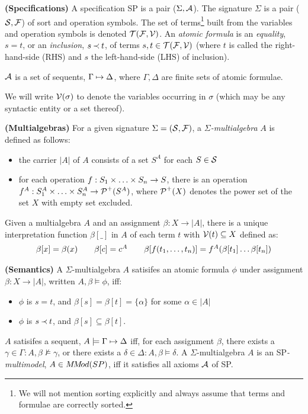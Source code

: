 \begin{DEFINITION} {\bf (Specifications)} \label{de:terms-vars-forms}
A specification SP is a pair ($\Sigma,\Ax$). The signature $\Sigma$ is a pair
($\Sorts,\Funcs$) of sort and operation symbols. 
The set of terms\footnote{We will not mention sorting explicitly
and always assume that terms and formulae are correctly sorted.}
 built from the variables and
operation symbols is denoted $\Terms{\Funcs,\C V}$. An {\em atomic formula} 
is an {\em equality}, $s=t$, or an {\em inclusion}, $s\Incl t$, of terms
$s,t\in\Terms{\Funcs,\Vars}$ (where $t$ is called the 
right-hand-side (RHS) and $s$ the left-hand-side (LHS) of inclusion).

 $\Ax$ is a set of sequents, $\Gamma\Seq\Delta$, where $\Gamma, \Delta$ are
finite sets of atomic formulae.
\end{DEFINITION}
\noindent
We will write $\C V(\sigma)$ to denote the variables occurring in $\sigma$ 
(which may be any syntactic entity or a set thereof).
%
\begin{DEFINITION} {\bf (Multialgebras)} \label{de:multialgebras}
For a given signature $\Sigma=(\Sorts,\Funcs)$, a {\em $\Sigma$-multialgebra} $A$
is defined as follows:
\begin{itemize}\MyLPar
\item  the carrier $|A|$ of $A$ consists of a set $S^A$ for each $S\in\Sorts$
\item for each operation $f: \List Sn\times \rightarrow S$, there is an operation
$f^A: \List {S^A}n\times \rightarrow \C P^+(S^A)$, where $\C P^+(X)$ denotes the 
power set of the set $X$ with empty set excluded.
\end{itemize}
\end{DEFINITION}
\noindent
Given a multialgebra $A$ and an assignment $\beta:X\rightarrow |A|$, there is a
unique interpretation function $\beta [\_]$ in $A$ of each term $t$ 
with $\C V(t)\subseteq X$ defined as:
\[ \begin{array}{ccccc} 
\beta [x] = \beta (x) & & \beta [c] = c^A
& & \beta [f(\List tn,)] = f^A(\beta[t_1]\ldots \beta[t_n]) 
\end{array} \]
%
\begin{DEFINITION} {\bf (Semantics)} \label{de:semantics}
A $\Sigma$-multialgebra $A$ satisifes an atomic formula $\phi$ under assignment
 $\beta:X\rightarrow |A|$, written $A,\beta\models \phi$, iff:
\begin{itemize}\MyLPar
\item $\phi$ is $s=t$, and $\beta[s]=\beta[t]=\{\alpha\}$ for some $\alpha\in |A|$
\item $\phi$ is $s\Incl t$, and $\beta[s]\subseteq\beta[t]$.
\end{itemize}
 $A$ satisifes a sequent, $A\models\Gamma\Seq\Delta$ iff,
for each assignment $\beta$, there exists a $\gamma\in\Gamma : A,\beta\not\models
\gamma$, or there exists a $\delta\in\Delta: A,\beta\models \delta$. 
A $\Sigma$-multialgebra $A$ is an SP{\em-multimodel}, $A\in \MMod(SP)$, iff it satisfies 
all axioms $\Ax$ of SP.
\end{DEFINITION}
